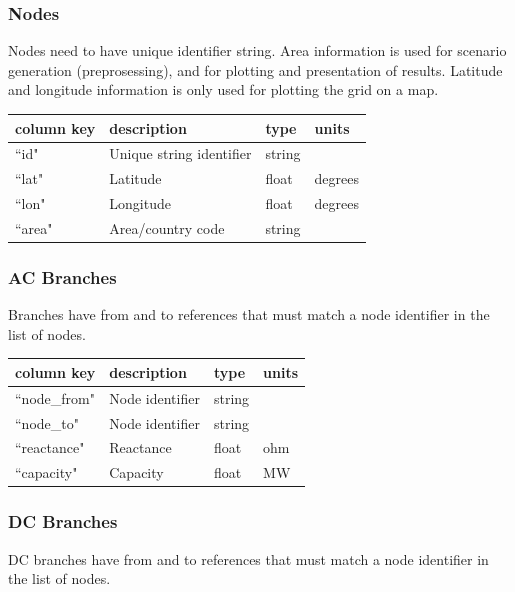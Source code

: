 \documentclass{article}
\begin{document}
\subsubsection{Nodes}
Nodes need to have unique identifier string. Area information is used for scenario generation (preprosessing), and for plotting and presentation of results.
Latitude and longitude information is only used for plotting the grid on a map.

\medskip
\begin{tabular}{llll}
	\hline
	column key & description & type & units \\
	\hline
	``id"	&	Unique string identifier 	& string	& \\
	``lat"	&	Latitude				& float 	& degrees \\
	``lon"	&	Longitude				& float	& degrees \\
	``area" &	Area/country code		& string	& \\
	\hline
\end{tabular}


\subsubsection{AC Branches}
Branches have from and to references that must match a node identifier in the list of nodes.

\medskip
\begin{tabular}{llll}
	\hline
	column key & description & type & units \\
	\hline
	``node\_from"	&	Node identifier 	& string	& \\
	``node\_to"		&	Node identifier	& string	& \\
	``reactance"	&	Reactance	& float	& ohm \\
	``capacity"		&	Capacity & float		& MW \\
	\hline
\end{tabular}

\subsubsection{DC Branches}
DC branches have from and to references that must match a node identifier in the list of nodes.
\end{document}
